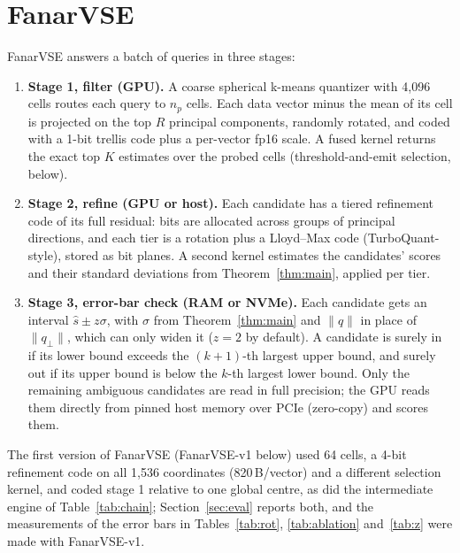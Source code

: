 \documentclass[fleqn,10pt]{wlscirep}
\begin{document}
\section{FanarVSE}\label{sec:system}
FanarVSE answers a batch of queries in three stages:
\begin{enumerate}
\item \textbf{Stage 1, filter (GPU).} A coarse spherical k-means quantizer with 4{,}096 cells routes each query to $n_p$ cells. Each data vector minus the mean of its cell is projected on the top $R$ principal components, randomly rotated, and coded with a 1-bit trellis code plus a per-vector fp16 scale. A fused kernel returns the exact top $K$ estimates over the probed cells (threshold-and-emit selection, below).
\item \textbf{Stage 2, refine (GPU or host).} Each candidate has a tiered refinement code of its full residual: bits are allocated across groups of principal directions, and each tier is a rotation plus a Lloyd--Max code (TurboQuant-style), stored as bit planes. A second kernel estimates the candidates' scores and their standard deviations from Theorem~\ref{thm:main}, applied per tier.
\item \textbf{Stage 3, error-bar check (RAM or NVMe).} Each candidate gets an interval $\hat s\pm z\sigma$, with $\sigma$ from Theorem~\ref{thm:main} and $\|q\|$ in place of $\|q_\perp\|$, which can only widen it ($z=2$ by default). A candidate is surely in if its lower bound exceeds the $(k{+}1)$-th largest upper bound, and surely out if its upper bound is below the $k$-th largest lower bound. Only the remaining ambiguous candidates are read in full precision; the GPU reads them directly from pinned host memory over PCIe (zero-copy) and scores them.
\end{enumerate}
The first version of FanarVSE (FanarVSE-v1 below) used 64 cells, a 4-bit refinement code on all 1{,}536 coordinates (820\,B/vector) and a different selection kernel, and coded stage 1 relative to one global centre, as did the intermediate engine of Table~\ref{tab:chain}; Section~\ref{sec:eval} reports both, and the measurements of the error bars in Tables~\ref{tab:rot}, \ref{tab:ablation} and~\ref{tab:z} were made with FanarVSE-v1.
\end{document}
